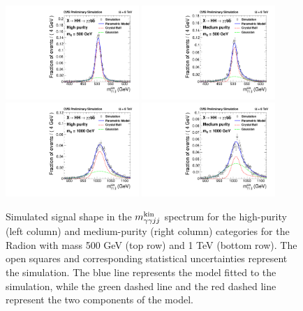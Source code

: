 \begin{figure}[ht]
 \begin{center}
   \includegraphics[width=0.45\textwidth]{figures/results/sigmodel_cat0_500GeV.pdf}
   \includegraphics[width=0.45\textwidth]{figures/results/sigmodel_cat1_500GeV.pdf}
   \includegraphics[width=0.45\textwidth]{figures/results/sigmodel_cat0_1000GeV.pdf}
   \includegraphics[width=0.45\textwidth]{figures/results/sigmodel_cat1_1000GeV.pdf}
 \end{center}
\caption{Simulated signal shape in the $m_{\gamma\gamma jj}^{\rm kin}$ spectrum for the high-purity (left column)
and medium-purity (right column) categories for the Radion with mass 500 GeV (top row) and
1 TeV (bottom row). The open squares and corresponding
statistical uncertainties represent the simulation.
The blue line represents the model fitted to the simulation, while the green dashed line
and the red dashed line represent the two components of the model.}
\label{fig:sigfit_500_1000}
\end{figure}


